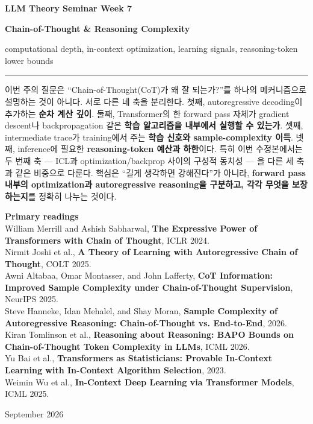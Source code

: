 \documentclass[11pt,a4paper,oneside,openany]{memoir}
\theoremstyle{definition}
\begin{document}
\begin{titlingpage}
\thispagestyle{empty}
\vspace*{1.2cm}
{\small\bfseries LLM Theory Seminar \hfill Week 7\par}
\vspace{1.4cm}
{\huge\bfseries Chain-of-Thought \& Reasoning Complexity\par}
\vspace{0.55cm}
{\large computational depth, in-context optimization, learning signals, reasoning-token lower bounds\par}
\vspace{0.9cm}
\rule{\textwidth}{0.7pt}
\vspace{1.1cm}

\begin{minipage}{0.86\textwidth}
\small
이번 주의 질문은 ``Chain-of-Thought(CoT)가 왜 잘 되는가?''를 하나의 메커니즘으로 설명하는 것이 아니다.
서로 다른 네 축을 분리한다. 첫째, autoregressive decoding이 추가하는 \textbf{순차 계산 깊이}. 둘째, Transformer의 한 forward pass 자체가 gradient descent나 backpropagation 같은 \textbf{학습 알고리즘을 내부에서 실행할 수 있는가}. 셋째, intermediate trace가 training에서 주는 \textbf{학습 신호와 sample-complexity 이득}. 넷째, inference에 필요한 \textbf{reasoning-token 예산과 하한}이다.
특히 이번 수정본에서는 두 번째 축 --- ICL과 optimization/backprop 사이의 구성적 동치성 --- 을 다른 세 축과 같은 비중으로 다룬다.
핵심은 ``길게 생각하면 강해진다''가 아니라, \textbf{forward pass 내부의 optimization과 autoregressive reasoning을 구분하고, 각각 무엇을 보장하는지}를 정확히 나누는 것이다.
\end{minipage}

\vfill
{\small
\textbf{Primary readings}\\[0.25em]
William Merrill and Ashish Sabharwal,
\textbf{The Expressive Power of Transformers with Chain of Thought}, ICLR 2024.\\
Nirmit Joshi et al.,
\textbf{A Theory of Learning with Autoregressive Chain of Thought}, COLT 2025.\\
Awni Altabaa, Omar Montasser, and John Lafferty,
\textbf{CoT Information: Improved Sample Complexity under Chain-of-Thought Supervision}, NeurIPS 2025.\\
Steve Hanneke, Idan Mehalel, and Shay Moran,
\textbf{Sample Complexity of Autoregressive Reasoning: Chain-of-Thought vs. End-to-End}, 2026.\\
Kiran Tomlinson et al.,
\textbf{Reasoning about Reasoning: BAPO Bounds on Chain-of-Thought Token Complexity in LLMs}, ICML 2026.\\
Yu Bai et al.,
\textbf{Transformers as Statisticians: Provable In-Context Learning with In-Context Algorithm Selection}, 2023.\\
Weimin Wu et al.,
\textbf{In-Context Deep Learning via Transformer Models}, ICML 2025.
\par}
\vspace{0.8cm}
{\small September 2026\par}
\end{titlingpage}
\end{document}
